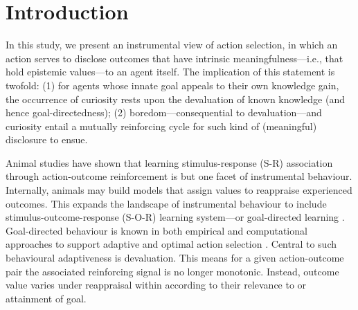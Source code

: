 \documentclass[utf8]{frontiersSCNS}
\begin{document}
\section{Introduction}

In this study, we present an instrumental view of action selection, in which an action serves to disclose outcomes that have intrinsic meaningfulness---i.e., that hold epistemic values---to an agent itself. The implication of this statement is twofold: (1) for agents whose innate goal appeals to their own knowledge gain, the occurrence of curiosity rests upon the devaluation of known knowledge (and hence goal-directedness); (2) boredom---consequential to devaluation---and curiosity entail a mutually reinforcing cycle for such kind of (meaningful) disclosure to ensue.

Animal studies have shown that learning stimulus-response (S-R) association through action-outcome reinforcement is but one facet of instrumental behaviour. Internally, animals may build models that assign values to reappraise experienced outcomes. This expands the landscape of instrumental behaviour to include stimulus-outcome-response (S-O-R) learning system---or goal-directed learning \citep{Balleine.1998}. Goal-directed behaviour is known in both empirical and computational approaches to support adaptive and optimal action selection \citep{adams1981instrumental, adams1982variations, mannella2016goal}. Central to such behavioural adaptiveness is devaluation. This means for a given action-outcome pair the associated reinforcing signal is no longer monotonic. Instead, outcome value varies under reappraisal within according to their relevance to or attainment of goal. 
\end{document}
